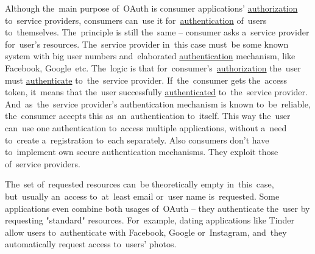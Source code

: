 Although the~main purpose of~OAuth is consumer applications' \hyperref[authenticationauthorization]{authorization} to~service providers, consumers can~use it for~\hyperref[authenticationauthorization]{authentication} of~users to~themselves.
The~principle is still the~same -- consumer asks a~service provider for~user's resources.
The~service provider in~this case must~be some known system with big user numbers and~elaborated \hyperref[authenticationauthorization]{authentication} mechanism, like Facebook, Google~etc.
The~logic is that for~consumer's~\hyperref[authenticationauthorization]{authorization} the~user must \hyperref[authenticationauthorization]{authenticate} to~the~service provider.
If~the~consumer gets the~access token, it~means that the~user successfully \hyperref[authenticationauthorization]{authenticated} to~the~service provider.
And~as~the~service provider's authentication mechanism is known to~be~reliable, the~consumer accepts this as~an~authentication to~itself.
This way the~user can~use one authentication to~access multiple applications, without a~need to~create a~registration to~each separately.
Also consumers don't have to~implement own secure authentication mechanisms.
They exploit those of~service providers.

The~set of~requested resources can~be theoretically empty in~this~case, but~usually an~access to~at~least email or~user name is~requested.
Some applications even combine both usages of~OAuth -- they authenticate the~user by requesting "standard" resources.
For~example, dating applications like Tinder allow users to~authenticate with Facebook, Google or~Instagram, and~they automatically request access to~users' photos.

